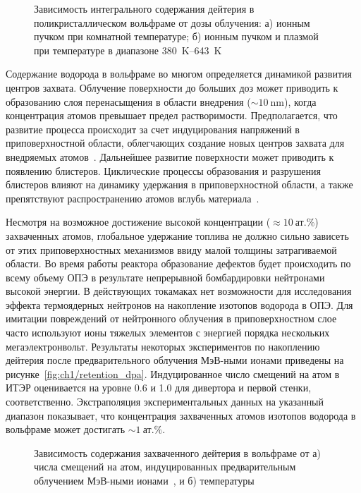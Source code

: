 \begin{figure}[ht]
    \caption{Зависимость интегрального содержания дейтерия в поликристаллическом вольфраме от дозы облучения: а) ионным пучком при комнатной температуре; б) ионным пучком и плазмой при температуре в диапазоне \SIrange{380}{643}{\kelvin}~\cite{HarutunyanThesis}}\label{fig:ch1/retention_fluence}
\end{figure}

Содержание водорода в вольфраме во многом определяется динамикой развития центров захвата. Облучение поверхности до больших доз может приводить к образованию слоя перенасыщения в области внедрения (\( \sim \SI{10}{\nano\meter} \)), когда концентрация атомов превышает предел растворимости. Предполагается, что развитие процесса происходит за счет индуцирования напряжений в приповерхностной области, облегчающих создание новых центров захвата для внедряемых атомов~\cite{Nishijima2023}. Дальнейшее развитие поверхности может приводить к появлению блистеров. Циклические процессы образования и разрушения блистеров влияют на динамику удержания в приповерхностной области, а также препятствуют распространению атомов вглубь материала~\cite{Bauer2017}.  

Несмотря на возможное достижение высокой концентрации (\( \approx \SI{10}{\text{ат.}\percent} \)) захваченных атомов, глобальное удержание топлива не должно сильно зависеть от этих приповерхностных механизмов ввиду малой толщины затрагиваемой области. Во время работы реактора образование дефектов будет происходить по всему объему ОПЭ в результате непрерывной бомбардировки нейтронами высокой энергии. В действующих токамаках нет возможности для исследования эффекта термоядерных нейтронов на накопление изотопов водорода в ОПЭ. Для имитации повреждений от нейтронного облучения в приповерхностном слое часто используют ионы тяжелых элементов с энергией порядка нескольких мегаэлектронвольт. Результаты некоторых экспериментов по накоплению дейтерия после предварительного облучения МэВ-ными ионами приведены на рисунке~\cref{fig:ch1/retention_dpa}. Индуцированное число смещений на атом в ИТЭР оценивается на уровне \num{0.6} и \num{1.0} для дивертора и первой стенки, соответственно. Экстраполяция экспериментальных данных на указанный диапазон показывает, что концентрация захваченных атомов изотопов водорода в вольфраме может достигать \( \sim \SI{1}{\text{ат.}\percent} \). 

\begin{figure}[ht]
    \caption{Зависимость содержания захваченного дейтерия в вольфраме от а) числа смещений на атом, индуцированных предварительным облучением МэВ-ными ионами~\cite{Roth2011}, и б) температуры~\cite{Rieth2019}}
\end{figure}

